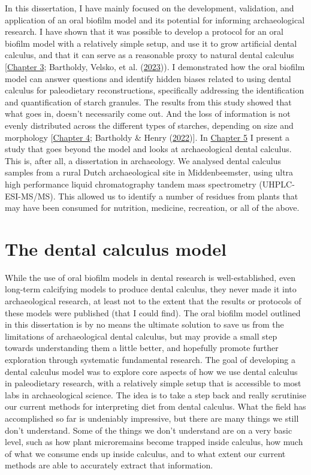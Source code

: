 \documentclass[
  b5paper,
]{book}
\begin{document}
In this dissertation, I have mainly focused on the development,
validation, and application of an oral biofilm model and its potential
for informing archaeological research. I have shown that it was possible
to develop a protocol for an oral biofilm model with a relatively simple
setup, and use it to grow artificial dental calculus, and that it can
serve as a reasonable proxy to natural dental calculus
{[}\protect\hyperlink{byoc-valid}{Chapter 3}; Bartholdy, Velsko, et al.
(\protect\hyperlink{ref-bartholdyAssessingValidity2023}{2023})). I
demonstrated how the oral biofilm model can answer questions and
identify hidden biases related to using dental calculus for paleodietary
reconstructions, specifically addressing the identification and
quantification of starch granules. The results from this study showed
that what goes in, doesn't necessarily come out. And the loss of
information is not evenly distributed across the different types of
starches, depending on size and morphology
{[}\protect\hyperlink{byoc-starch}{Chapter 4}; Bartholdy \& Henry
(\protect\hyperlink{ref-bartholdyInvestigatingBiases2022}{2022}){]}. In
\protect\hyperlink{mb11CalculusPilot}{Chapter 5} I present a study that
goes beyond the model and looks at archaeological dental calculus. This
is, after all, a dissertation in archaeology. We analysed dental
calculus samples from a rural Dutch archaeological site in
Middenbeemster, using ultra high performance liquid chromatography
tandem mass spectrometry (UHPLC-ESI-MS/MS). This allowed us to identify
a number of residues from plants that may have been consumed for
nutrition, medicine, recreation, or all of the above.

\hypertarget{the-dental-calculus-model}{%
\section{The dental calculus model}\label{the-dental-calculus-model}}

While the use of oral biofilm models in dental research is
well-established, even long-term calcifying models to produce dental
calculus, they never made it into archaeological research, at least not
to the extent that the results or protocols of these models were
published (that I could find). The oral biofilm model outlined in this
dissertation is by no means the ultimate solution to save us from the
limitations of archaeological dental calculus, but may provide a small
step towards understanding them a little better, and hopefully promote
further exploration through systematic fundamental research. The goal of
developing a dental calculus model was to explore core aspects of how we
use dental calculus in paleodietary research, with a relatively simple
setup that is accessible to most labs in archaeological science. The
idea is to take a step back and really scrutinise our current methods
for interpreting diet from dental calculus. What the field has
accomplished so far is undeniably impressive, but there are many things
we still don't understand. Some of the things we don't understand are on
a very basic level, such as how plant microremains become trapped inside
calculus, how much of what we consume ends up inside calculus, and to
what extent our current methods are able to accurately extract that
information.
\end{document}
